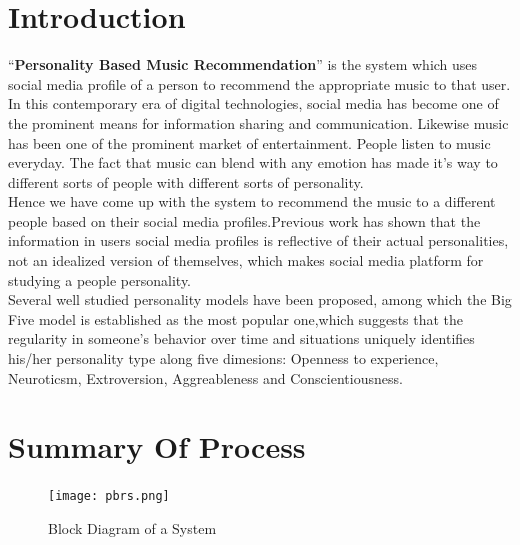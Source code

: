 \documentclass[a4paper, 12pt, onepage]{article}
\begin{document}
      \setcounter{page}{2}
      \cleardoublepage
      {
        \setlength{\parskip}{0em}
        \renewcommand\contentsname{Table of Contents}
        \tableofcontents {}
      }


      \cleardoublepage
      \section{Introduction}
	``\textbf{Personality Based Music Recommendation}'' is the system which uses social media profile of a person to recommend the appropriate music to that user. In this contemporary era of digital technologies, social media has become one of the prominent means for information sharing and communication. Likewise music has been one of the prominent market of entertainment. People listen to music everyday. The fact that music can blend with any emotion has made it's way to different sorts of people with different sorts of personality.\\
	Hence we have come up with the system to recommend the music to a different people based on their social media profiles.Previous work has shown that the information in users social media profiles is reflective of their actual personalities, not an idealized version of themselves, which makes social media platform for studying a people personality.\\
	Several well studied personality models have been proposed, among which the Big Five model is established as the most popular one,which suggests that the regularity in someone's behavior over time and situations uniquely identifies his/her personality type along five dimesions: Openness to experience, Neuroticsm, Extroversion, Aggreableness and Conscientiousness.

      \cleardoublepage
      \section{Summary Of Process}
      \begin{figure}[ht!]
	      \texttt{[image: pbrs.png]}
		\caption{Block Diagram of a System}
	\end{figure}
\end{document}

